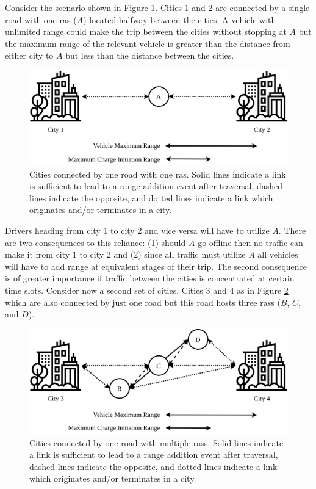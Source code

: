 Consider the scenario shown in Figure \ref{fig:connected_cities_1}. Cities 1 and 2 are connected by a single road with one \gls{ras} ($A$) located halfway between the cities. A vehicle with unlimited range could make the trip between the cities without stopping at $A$ but the maximum range of the relevant vehicle is greater than the distance from either city to $A$ but less than the distance between the cities.

\begin{figure}[H]
	\centering
	\includegraphics[width = .66\linewidth]{figs/connected_cities_1.png}
	\caption{Cities connected by one road with one \gls{ras}. Solid lines indicate a link is sufficient to lead to a range addition event after traversal, dashed lines indicate the opposite, and dotted lines indicate a link which originates and/or terminates in a city.}
	\label{fig:connected_cities_1}
\end{figure}

Drivers heading from city 1 to city 2 and vice versa will have to utilize $A$. There are two consequences to this reliance: (1) should $A$ go offline then no traffic can make it from city 1 to city 2 and (2) since all traffic must utilize $A$ all vehicles will have to add range at equivalent stages of their trip. The second consequence is of greater importance if traffic between the cities is concentrated at certain time slots. Consider now a second set of cities, Cities 3 and 4 as in Figure \ref{fig:connected_cities_2} which are also connected by just one road but this road hosts three \glspl{ras} ($B$, $C$, and $D$).

\begin{figure}[H]
	\centering
	\includegraphics[width = .66\linewidth]{figs/connected_cities_2.png}
	\caption{Cities connected by one road with multiple \glspl{ras}. Solid lines indicate a link is sufficient to lead to a range addition event after traversal, dashed lines indicate the opposite, and dotted lines indicate a link which originates and/or terminates in a city.}
	\label{fig:connected_cities_2}
\end{figure}

